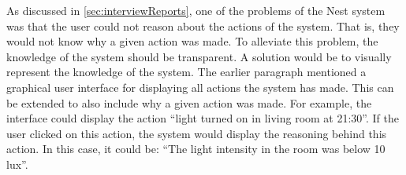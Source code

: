 As discussed in \cref{sec:interviewReports}, one of the problems of the Nest system was that the user could not reason about the actions of the system. That is, they would not know why a given action was made. To alleviate this problem, the knowledge of the system should be transparent. A solution would be to visually represent the knowledge of the system. The earlier paragraph mentioned a graphical user interface for displaying all actions the system has made. This can be extended to also include why a given action was made. For example, the interface could display the action \enquote{light turned on in living room at 21:30}. If the user clicked on this action, the system would display the reasoning behind this action. In this case, it could be: \enquote{The light intensity in the room was below 10 lux}.